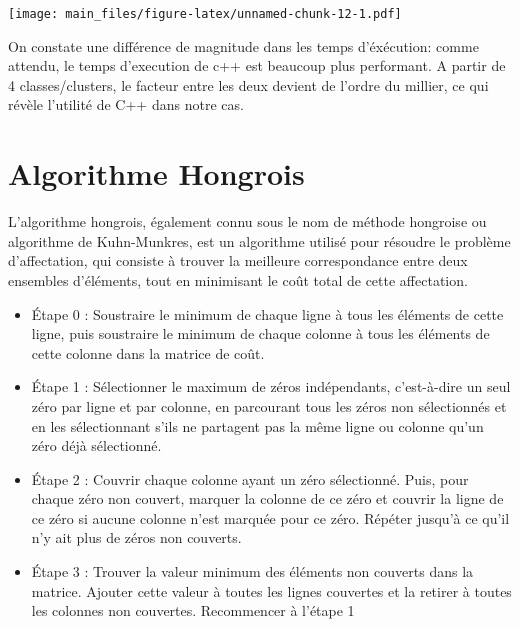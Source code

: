 \documentclass[
]{article}
\providecommand{\tightlist}{%
  \setlength{\itemsep}{0pt}\setlength{\parskip}{0pt}}
\begin{document}
\texttt{[image: main\_files/figure-latex/unnamed-chunk-12-1.pdf]}

On constate une différence de magnitude dans les temps d'éxécution:
comme attendu, le temps d'execution de c++ est beaucoup plus performant.
A partir de 4 classes/clusters, le facteur entre les deux devient de
l'ordre du millier, ce qui révèle l'utilité de C++ dans notre cas.

\hypertarget{algorithme-hongrois}{%
\section{Algorithme Hongrois}\label{algorithme-hongrois}}

L'algorithme hongrois, également connu sous le nom de méthode hongroise
ou algorithme de Kuhn-Munkres, est un algorithme utilisé pour résoudre
le problème d'affectation, qui consiste à trouver la meilleure
correspondance entre deux ensembles d'éléments, tout en minimisant le
coût total de cette affectation.

\begin{itemize}
\tightlist
\item
  Étape 0 : Soustraire le minimum de chaque ligne à tous les éléments de
  cette ligne, puis soustraire le minimum de chaque colonne à tous les
  éléments de cette colonne dans la matrice de coût.
\end{itemize}

\begin{itemize}
\tightlist
\item
  Étape 1 : Sélectionner le maximum de zéros indépendants, c'est-à-dire
  un seul zéro par ligne et par colonne, en parcourant tous les zéros
  non sélectionnés et en les sélectionnant s'ils ne partagent pas la
  même ligne ou colonne qu'un zéro déjà sélectionné.
\end{itemize}

\begin{itemize}
\tightlist
\item
  Étape 2 : Couvrir chaque colonne ayant un zéro sélectionné. Puis, pour
  chaque zéro non couvert, marquer la colonne de ce zéro et couvrir la
  ligne de ce zéro si aucune colonne n'est marquée pour ce zéro. Répéter
  jusqu'à ce qu'il n'y ait plus de zéros non couverts.
\end{itemize}

\begin{itemize}
\tightlist
\item
  Étape 3 : Trouver la valeur minimum des éléments non couverts dans la
  matrice. Ajouter cette valeur à toutes les lignes couvertes et la
  retirer à toutes les colonnes non couvertes. Recommencer à l'étape 1
\end{itemize}
\end{document}
